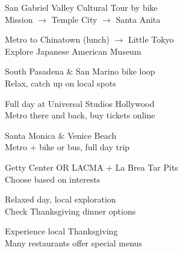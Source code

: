 \documentclass[10pt,letterpaper]{article}
\begin{document}
\begin{small}
\begin{tcolorbox}[colback=primary!5,colframe=primary!50,title=\textbf{Day 8 - Mon, Nov 17: SAN GABRIEL VALLEY}]
San Gabriel Valley Cultural Tour by bike\\
Mission $\rightarrow$ Temple City $\rightarrow$ Santa Anita
\end{tcolorbox}

\begin{tcolorbox}[colback=primary!5,colframe=primary!50,title=\textbf{Day 9 - Tue, Nov 18: ASIAN LA}]
Metro to Chinatown (lunch) $\rightarrow$ Little Tokyo\\
Explore Japanese American Museum
\end{tcolorbox}

\begin{tcolorbox}[colback=primary!5,colframe=primary!50,title=\textbf{Day 10 - Wed, Nov 19: LOCAL LOOP}]
South Pasadena \& San Marino bike loop\\
Relax, catch up on local spots
\end{tcolorbox}

\begin{tcolorbox}[colback=primary!5,colframe=primary!50,title=\textbf{Day 11 - Thu, Nov 20: UNIVERSAL STUDIOS}]
Full day at Universal Studios Hollywood\\
Metro there and back, buy tickets online
\end{tcolorbox}

\begin{tcolorbox}[colback=primary!5,colframe=primary!50,title=\textbf{Day 12 - Fri, Nov 21: BEACH DAY}]
Santa Monica \& Venice Beach\\
Metro + bike or bus, full day trip
\end{tcolorbox}

\begin{tcolorbox}[colback=primary!5,colframe=primary!50,title=\textbf{Day 13 - Sat, Nov 22: CULTURE}]
Getty Center OR LACMA + La Brea Tar Pits\\
Choose based on interests
\end{tcolorbox}

\begin{tcolorbox}[colback=primary!5,colframe=primary!50,title=\textbf{Day 14 - Sun, Nov 23: THANKSGIVING PREP}]
Relaxed day, local exploration\\
Check Thanksgiving dinner options
\end{tcolorbox}

\begin{tcolorbox}[colback=primary!5,colframe=primary!50,title=\textbf{Day 15 - Mon, Nov 24: THANKSGIVING}]
Experience local Thanksgiving\\
Many restaurants offer special menus
\end{tcolorbox}


\end{small}
\end{document}
